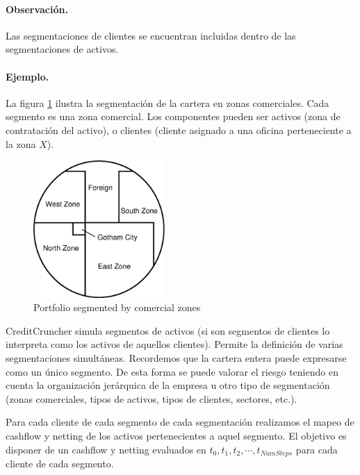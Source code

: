 \paragraph{Observaci\'on.} Las segmentaciones de clientes se encuentran
incluidas dentro de las segmentaciones de activos.

\paragraph{Ejemplo.} La figura \ref{fig:segments} ilustra la segmentaci\'on
de la cartera en zonas comerciales. Cada segmento es una zona comercial.
Los componentes pueden ser activos (zona de contrataci\'on del activo), o
clientes (cliente asignado a una oficina perteneciente a la zona $X$).

\begin{figure}[!hb]
\begin{center}
\includegraphics[width=5cm,angle=0]{./images/segments.eps}
\caption{Portfolio segmented by comercial zones}
\label{fig:segments}
\end{center}
\end{figure}

CreditCruncher simula segmentos de activos (si son segmentos de clientes lo
interpreta como los activos de aquellos clientes). Permite la definici\'on
de varias segmentaciones simult\'aneas. Recordemos que la cartera entera
puede expresarse como un \'unico segmento. De esta forma se puede valorar
el riesgo teniendo en cuenta la organizaci\'on jer\'arquica de la empresa
u otro tipo de segmentaci\'on (zonas comerciales, tipos de activos, tipos de
clientes, sectores, etc.).
\newline

Para cada cliente de cada segmento de cada segmentaci\'on realizamos el
mapeo de cashflow y netting de los activos pertenecientes a aquel
segmento. El objetivo es disponer de un cashflow y netting evaluados en
$t_0, t_1, t_2, \cdots, t_{NumSteps}$ para cada cliente de cada segmento.

